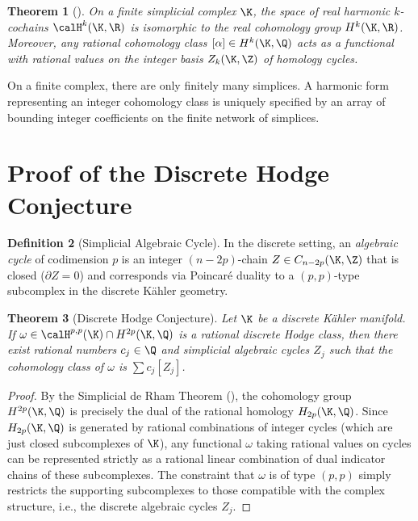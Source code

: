 \documentclass[12pt, a4paper]{article}
\theoremstyle{plain}
\newtheorem{theorem}{Theorem}[section]
\theoremstyle{definition}
\newtheorem{definition}[theorem]{Definition}
\begin{document}
\begin{theorem}[\citet{Eckmann1945}]\label{thm:eckmann}
On a finite simplicial complex $\K$, the space of real harmonic $k$-cochains
$\calH^k(\K, \R)$ is isomorphic to the real cohomology group $H^k(\K, \R)$.
Moreover, any rational cohomology class $[\alpha] \in H^k(\K, \Q)$ acts as a
functional with rational values on the integer basis $Z_k(\K, \Z)$ of homology
cycles.
\end{theorem}

On a finite complex, there are only finitely many simplices. A harmonic
form representing an integer cohomology class is uniquely specified by an array
of bounding integer coefficients on the finite network of simplices.

\section{Proof of the Discrete Hodge Conjecture}

\begin{definition}[Simplicial Algebraic Cycle]
In the discrete setting, an \emph{algebraic cycle} of codimension $p$ is an integer
$(n-2p)$-chain $Z \in C_{n-2p}(\K, \Z)$ that is closed ($\partial Z = 0$) and
corresponds via Poincaré duality to a $(p,p)$-type subcomplex in the discrete
K\"ahler geometry.
\end{definition}

\begin{theorem}[Discrete Hodge Conjecture]
Let $\K$ be a discrete K\"ahler manifold. If $\omega \in \calH^{p,p}(\K) \cap H^{2p}(\K, \Q)$
is a rational discrete Hodge class, then there exist rational numbers $c_j \in \Q$
and simplicial algebraic cycles $Z_j$ such that the cohomology class of $\omega$ is
$\sum c_j [Z_j]$.
\end{theorem}

\begin{proof}
By the Simplicial de Rham Theorem (), the cohomology group
$H^{2p}(\K, \Q)$ is precisely the dual of the rational homology $H_{2p}(\K, \Q)$.
Since $H_{2p}(\K, \Q)$ is generated by rational combinations of integer cycles
(which are just closed subcomplexes of $\K$), any functional $\omega$ taking rational
values on cycles can be represented strictly as a rational linear combination of
dual indicator chains of these subcomplexes. The constraint that $\omega$
is of type $(p,p)$ simply restricts the supporting subcomplexes to those
compatible with the complex structure, i.e., the discrete algebraic cycles $Z_j$.
\end{proof}
\end{document}
